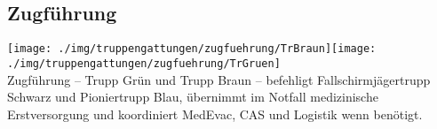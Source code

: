 \subsection{Zugführung}
\texttt{[image: ./img/truppengattungen/zugfuehrung/TrBraun]}\quad\texttt{[image: ./img/truppengattungen/zugfuehrung/TrGruen]}\\
Zugführung -- Trupp Grün und Trupp Braun -- befehligt Fallschirmjägertrupp Schwarz und Pioniertrupp Blau, übernimmt im Notfall medizinische Erstversorgung und koordiniert \ac{MedEvac}, \ac{CAS} und Logistik wenn benötigt. 